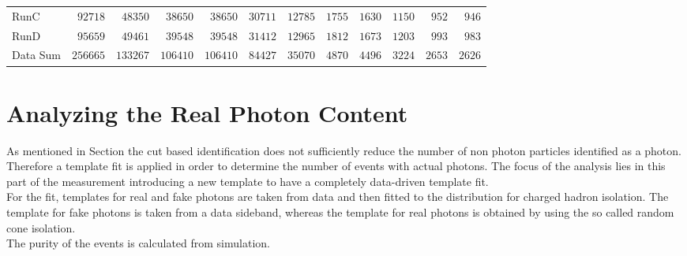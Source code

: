 \begin{landscape}
\begin{table}
\begin{tabular}{l | r r r r r r r r r r r }
             RunC &$             92718 $&$             48350 $&$             38650 $&$             38650 $&$             30711 $&$             12785 $&$              1755 $&$              1630 $&$              1150 $&$               952 $&$               946 $ \\

             RunD &$             95659 $&$             49461 $&$             39548 $&$             39548 $&$             31412 $&$             12965 $&$              1812 $&$              1673 $&$              1203 $&$               993 $&$               983 $ \\

\hline

         Data Sum &$            256665 $&$            133267 $&$            106410 $&$            106410 $&$             84427 $&$             35070 $&$              4870 $&$              4496 $&$              3224 $&$              2653 $&$              2626 $ \\

\hline

\end{tabular}
\label{tab_ttg_sel_evt}
\end{table}
\end{landscape}

\section{Analyzing the Real Photon Content}

As mentioned in Section  the cut based identification does not sufficiently reduce the number of non photon particles identified as a photon. Therefore a template fit is applied in order to determine the number of events with actual photons. The focus of the analysis lies in this part of the measurement introducing a new template to have a completely data-driven template fit.\\
For the fit, templates for real and fake photons are taken from data and then fitted to the distribution for charged hadron isolation. The template for fake photons is taken from a data sideband, whereas the template for real photons is obtained by using the so called random cone isolation.\\
The purity of the \ttgamma events is calculated from simulation.\\

